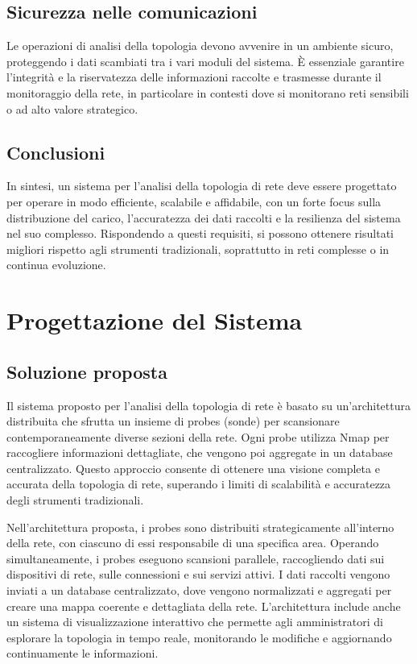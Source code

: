 \documentclass[target=bach,aauheader=,style=]{thud}
\begin{document}
\section{Sicurezza nelle comunicazioni}
Le operazioni di analisi della topologia devono avvenire in un ambiente sicuro, proteggendo i dati scambiati tra i vari moduli del sistema. È essenziale garantire l'integrità e la riservatezza delle informazioni raccolte e trasmesse durante il monitoraggio della rete, in particolare in contesti dove si monitorano reti sensibili o ad alto valore strategico.

\section{Conclusioni}

In sintesi, un sistema per l'analisi della topologia di rete deve essere progettato per operare in modo efficiente, scalabile e affidabile, con un forte focus sulla distribuzione del carico, l'accuratezza dei dati raccolti e la resilienza del sistema nel suo complesso. Rispondendo a questi requisiti, si possono ottenere risultati migliori rispetto agli strumenti tradizionali, soprattutto in reti complesse o in continua evoluzione.

\chapter{Progettazione del Sistema}

\section{Soluzione proposta}
Il sistema proposto per l'analisi della topologia di rete è basato su un'architettura distribuita che sfrutta un insieme di probes (sonde) per scansionare contemporaneamente diverse sezioni della rete. Ogni probe utilizza Nmap per raccogliere informazioni dettagliate, che vengono poi aggregate in un database centralizzato. Questo approccio consente di ottenere una visione completa e accurata della topologia di rete, superando i limiti di scalabilità e accuratezza degli strumenti tradizionali.

Nell'architettura proposta, i probes sono distribuiti strategicamente all'interno della rete, con ciascuno di essi responsabile di una specifica area. Operando simultaneamente, i probes eseguono scansioni parallele, raccogliendo dati sui dispositivi di rete, sulle connessioni e sui servizi attivi. I dati raccolti vengono inviati a un database centralizzato, dove vengono normalizzati e aggregati per creare una mappa coerente e dettagliata della rete. L'architettura include anche un sistema di visualizzazione interattivo che permette agli amministratori di esplorare la topologia in tempo reale, monitorando le modifiche e aggiornando continuamente le informazioni.
\end{document}
